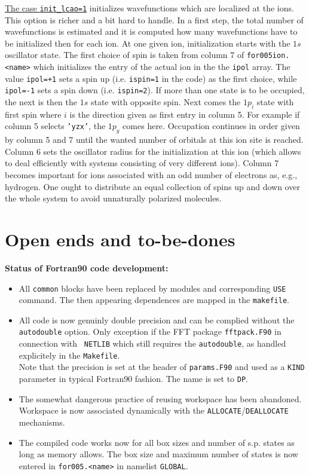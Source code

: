 \documentclass[12pt]{article}
\begin{document}
\begin{enumerate}
\underline{The case {\tt init\_lcao=1}} initializes wavefunctions
which are localized at the ions. This option is richer and a bit hard
to handle. In a first step, the total number of wavefunctions is
estimated and it is computed how many wavefunctions have to be
initialized then for each ion. At one given ion, initialization starts
with the $1s$ oscillator state. The first choice of spin is taken from
column 7 of {\tt for005ion.<name>} {which initializes the entry of the
  actual ion in the the {\tt ipol}
array. The value {\tt ipol=+1} sets a spin up (i.e. {\tt ispin=1} in
the code) as the first choice, 
while {\tt ipol=-1} sets a spin down (i.e. {\tt ispin=2}).} If more than one state is to be
occupied, the next is then the $1s$ state with opposite spin. Next
comes the $1p_i$ state with first spin where $i$ is the direction
given as first entry in column 5. For example if column 5 selects
{\tt 'yzx'}, the $1p_y$ comes here. Occupation continues in order
given by column 5 and 7 until the wanted number of orbitals at this
ion site is reached. Column 6 sets the oscillator radius for the
initialization at this ion (which allows to deal efficiently with
systems consisting of very different ions). Column 7 becomes important
for ions associated with an odd number of electrons as, e.g.,
hydrogen. One ought to distribute an equal collection of 
{spins up and down over the whole system} to avoid unnaturally 
polarized molecules.

\newpage

\section{Open ends and to-be-dones}

{\Large\bf Status of Fortran90 code development:}
\begin{itemize}
  \item 
    All {\tt common} blocks have been replaced by modules
    and corresponding {\tt USE} command. The then appearing
    dependences are mapped in the {\tt makefile}.
  \item
    All code is now genuinly double precision and can be
    complied without the {\tt autodouble} option. Only exception
    if the FFT package {\tt fftpack.F90} in connection with {\tt
      NETLIB}
    which still requires
    the  {\tt autodouble}, as handled explicitely in the
    {\tt Makefile}.
    \\
    Note that the precision is set at the header of {\tt params.F90}
    and used as a {\tt KIND} parameter in typical Fortran90 fashion.
    The name is set to {\tt DP}.
  \item
    The somewhat dangerous practice of reusing workspace has been
    abandoned. Workspace is now associated dynamically with
    the {\tt ALLOCATE}/{\tt DEALLOCATE} mechanisms.
  \item
    The compiled code works now for all box sizes and number of s.p.
    states as long as memory allows. The box size and maximum number
    of states is now entered in {\tt for005.<name>} in namelist
    {\tt GLOBAL}.
\end{itemize}


\end{enumerate}
\end{document}

